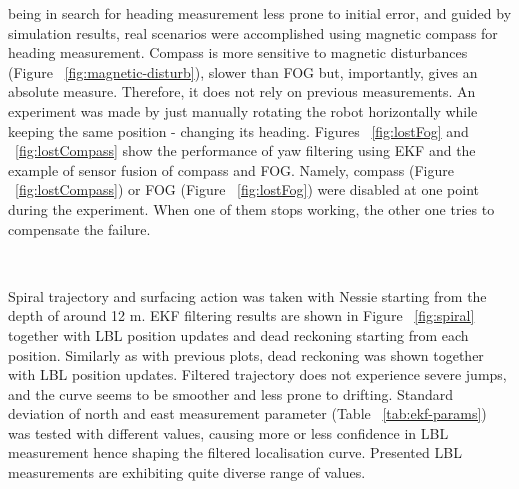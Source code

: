  being in search for heading measurement less prone to initial error, and guided by simulation results, real scenarios were accomplished using magnetic compass for heading measurement. Compass is more sensitive to magnetic disturbances (Figure ~\ref{fig:magnetic-disturb}), slower than FOG but, importantly, gives an absolute measure. Therefore, it does not rely on previous measurements. An experiment was made by just manually rotating the robot horizontally while keeping the same position - changing its heading. Figures ~\ref{fig:lostFog} and ~\ref{fig:lostCompass} show the performance of yaw filtering using EKF and the example of sensor fusion of compass and FOG. Namely, compass (Figure ~\ref{fig:lostCompass}) or FOG (Figure ~\ref{fig:lostFog}) were disabled at one point during the experiment. When one of them stops working, the other one tries to compensate the failure. 
\begin{figure}%
  \centering
     \\   
\end{figure}

 Spiral trajectory and surfacing action was taken with Nessie starting from the depth of around 12 m. EKF filtering results are shown in Figure ~\ref{fig:spiral} together with LBL position updates and dead reckoning starting from each position. Similarly as with previous plots, dead reckoning was shown together with LBL position updates. Filtered trajectory does not experience severe jumps, and the curve seems to be smoother and less prone to drifting. Standard deviation of north and east measurement parameter (Table ~\ref{tab:ekf-params}) was tested with different values, causing more or less confidence in LBL measurement hence shaping the filtered localisation curve. Presented LBL measurements are exhibiting quite diverse range of values.


